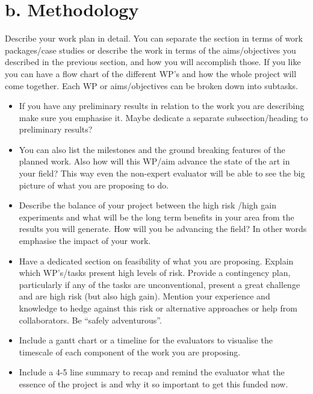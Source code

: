\section*{b. Methodology}
\noindent
Describe your work plan in detail. You can separate the section in terms of work packages/case studies or describe the work in terms of the aims/objectives you described in the previous section, and how you will accomplish those. If you like you can have a flow chart of the different WP’s and how the whole project will come together. Each WP or aims/objectives can be broken down into subtasks.


\begin{itemize}
\item If you have any preliminary results in relation to the work you are describing make sure you emphasise it. Maybe dedicate a separate subsection/heading to preliminary results?
\item You can also list the milestones and the ground breaking features of the planned work. Also how will this WP/aim advance the state of the art in your field? This way even the non-expert evaluator will be able to see the big picture of what you are proposing to do.
\item Describe the balance of your project between the high risk /high gain experiments and what will be the long term benefits in your area from the results you will generate. How will you be advancing the field? In other words emphasise the impact of your work.
\item Have a dedicated section on feasibility of what you are proposing. Explain which WP’s/tasks present high levels of risk. Provide a contingency plan, particularly if any of the tasks are unconventional, present a great challenge and are high risk (but also high gain). Mention your experience and knowledge to hedge against this risk or alternative approaches or help from collaborators. Be “safely adventurous”.
\item Include a gantt chart or a timeline for the evaluators to visualise the timescale of each component of the work you are proposing.
\item Include a 4-5 line summary to recap and remind the evaluator what the essence of the project is and why it so important to get this funded now.
\end{itemize}

